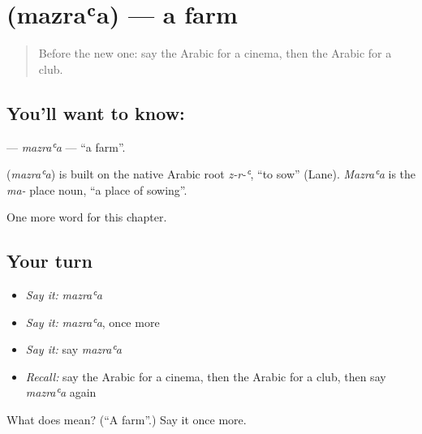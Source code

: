 \section[\texorpdfstring{\ar{مزرعة} (mazraʿa)}{مزرعة (mazraʿa)}]{ (mazraʿa) — a farm}

\label{lesson:AR-C265-mazraa}



\begin{quote}
Before the new one: say the Arabic for a cinema, then the Arabic for a club.
\end{quote}

\subsection*{You'll want to know: }
\textbf{} — \emph{mazraʿa} — \textquotedblleft{}a farm\textquotedblright{}.

\begin{cousinweb}
\textbf{} (\emph{mazraʿa}) is built on the native Arabic root \emph{z-r-ʿ}, \textquotedblleft{}to sow\textquotedblright{} (Lane). \emph{Mazraʿa} is the \emph{ma-} place noun, \textquotedblleft{}a place of sowing\textquotedblright{}.
\end{cousinweb}

\begin{grammarlens}[title={What you've built}]
One more word for this chapter.
\end{grammarlens}

\subsection*{Your turn}
\begin{itemize}
\raggedright
  \item \emph{Say it:} \emph{mazraʿa}
  \item \emph{Say it:} \emph{mazraʿa}, once more
  \item \emph{Say it:} say \emph{mazraʿa}
  \item \emph{Recall:} say the Arabic for a cinema, then the Arabic for a club, then say \emph{mazraʿa} again
\end{itemize}

\begin{tcolorbox}[breakable,colback=teal!4,colframe=teal!35!black,title={Before you move on}]
What does  mean? (\textquotedblleft{}A farm\textquotedblright{}.) Say it once more.
\end{tcolorbox}
